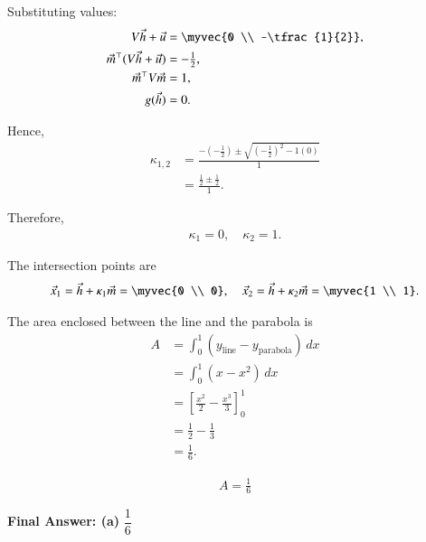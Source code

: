 \documentclass[journal]{IEEEtran}
\begin{document}
Substituting values:
\begin{align}
V\vec{h} + \vec{u} &= \myvec{0 \\ -\tfrac{1}{2}}, \\
\vec{m}^{\top}(V\vec{h} + \vec{u}) &= -\tfrac{1}{2}, \\
\vec{m}^{\top}V\vec{m} &= 1, \\
g(\vec{h}) &= 0.
\end{align}

Hence,
\begin{align}
\kappa_{1,2} &= 
\frac{-(-\tfrac{1}{2}) \pm \sqrt{(-\tfrac{1}{2})^2 - 1(0)}}{1} \\
&= \frac{\tfrac{1}{2} \pm \tfrac{1}{2}}{1}.
\end{align}

Therefore,
\begin{align}
\kappa_1 = 0, \quad \kappa_2 = 1.
\end{align}

The intersection points are
\begin{align}
\vec{x}_1 = \vec{h} + \kappa_1 \vec{m} = \myvec{0 \\ 0}, \quad
\vec{x}_2 = \vec{h} + \kappa_2 \vec{m} = \myvec{1 \\ 1}.
\end{align}

The area enclosed between the line and the parabola is
\begin{align}
A &= \int_{0}^{1} (y_{\text{line}} - y_{\text{parabola}})\,dx \\
  &= \int_{0}^{1} (x - x^2)\,dx \\
  &= \left[\frac{x^2}{2} - \frac{x^3}{3}\right]_0^1 \\
  &= \frac{1}{2} - \frac{1}{3} \\
  &= \frac{1}{6}.
\end{align}

\begin{align}
\boxed{A = \frac{1}{6}}
\end{align}

\noindent\textbf{Final Answer: (a) } $\dfrac{1}{6}$
\end{document}
